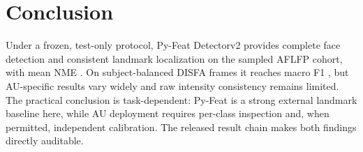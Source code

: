 \documentclass[10pt,journal]{IEEEtran}
\begin{document}
\section{Conclusion}

Under a frozen, test-only protocol, Py-Feat Detectorv2 provides complete face
detection and consistent landmark localization on the sampled AFLFP cohort,
with mean NME \AFLFPNMEMean{}. On subject-balanced DISFA frames it reaches
macro F1 \DISFAFOne{}, but AU-specific results vary widely and raw
intensity consistency remains limited. The practical conclusion is
task-dependent: Py-Feat is a strong external landmark baseline here, while AU
deployment requires per-class inspection and, when permitted, independent
calibration. The released result chain makes both findings directly
auditable.

\balance
\begingroup
\sloppy


\endgroup
\end{document}
